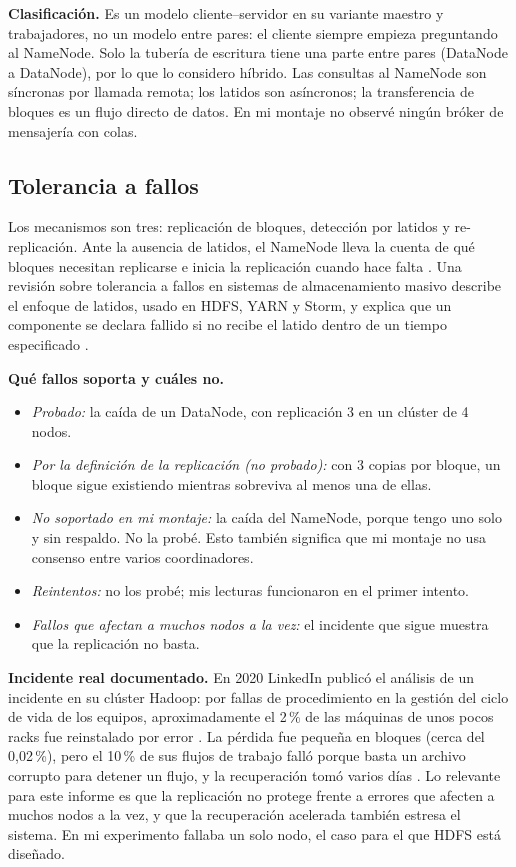 \documentclass[11pt,a4paper]{article}
\begin{document}
\textbf{Clasificación.} Es un modelo cliente--servidor en su variante maestro y trabajadores, no un modelo entre pares: el cliente siempre empieza preguntando al NameNode. Solo la tubería de escritura tiene una parte entre pares (DataNode a DataNode), por lo que lo considero híbrido. Las consultas al NameNode son síncronas por llamada remota; los latidos son asíncronos; la transferencia de bloques es un flujo directo de datos. En mi montaje no observé ningún bróker de mensajería con colas.

\subsection{Tolerancia a fallos}
Los mecanismos son tres: replicación de bloques, detección por latidos y re-replicación. Ante la ausencia de latidos, el NameNode lleva la cuenta de qué bloques necesitan replicarse e inicia la replicación cuando hace falta \cite{HadoopHDFSDesign}. Una revisión sobre tolerancia a fallos en sistemas de almacenamiento masivo describe el enfoque de latidos, usado en HDFS, YARN y Storm, y explica que un componente se declara fallido si no recibe el latido dentro de un tiempo especificado \cite{Saadoon2022}.

\textbf{Qué fallos soporta y cuáles no.}
\begin{itemize}
  \item \emph{Probado:} la caída de un DataNode, con replicación 3 en un clúster de 4 nodos.
  \item \emph{Por la definición de la replicación (no probado):} con 3 copias por bloque, un bloque sigue existiendo mientras sobreviva al menos una de ellas.
  \item \emph{No soportado en mi montaje:} la caída del NameNode, porque tengo uno solo y sin respaldo. No la probé. Esto también significa que mi montaje no usa consenso entre varios coordinadores.
  \item \emph{Reintentos:} no los probé; mis lecturas funcionaron en el primer intento.
  \item \emph{Fallos que afectan a muchos nodos a la vez:} el incidente que sigue muestra que la replicación no basta.
\end{itemize}

\textbf{Incidente real documentado.} En 2020 LinkedIn publicó el análisis de un incidente en su clúster Hadoop: por fallas de procedimiento en la gestión del ciclo de vida de los equipos, aproximadamente el 2\,\% de las máquinas de unos pocos racks fue reinstalado por error \cite{LinkedIn2020}. La pérdida fue pequeña en bloques (cerca del 0,02\,\%), pero el 10\,\% de sus flujos de trabajo falló porque basta un archivo corrupto para detener un flujo, y la recuperación tomó varios días \cite{LinkedIn2020}. Lo relevante para este informe es que la replicación no protege frente a errores que afecten a muchos nodos a la vez, y que la recuperación acelerada también estresa el sistema. En mi experimento fallaba un solo nodo, el caso para el que HDFS está diseñado.
\end{document}
